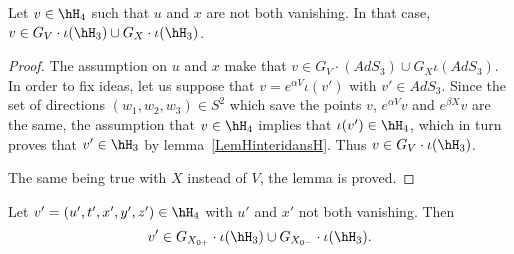 	\begin{lemma}		\label{LemPresqueHOrQadp}
		Let $v\in\hH_4$ such that $u$ and $x$ are not both vanishing. In that case, $v\in G_V\cdot \iota(\hH_3)\cup G_X\cdot\iota(\hH_3)$.
	\end{lemma}

	\begin{proof}
		The assumption on $u$ and $x$ make that $v\in G_V\cdot(AdS_3)\cup G_X\iota(AdS_3)$. In order to fix ideas, let us suppose that $v= e^{\alpha V}\iota(v')$ with $v'\in AdS_3$. Since the set of directions $(w_1,w_2,w_3)\in S^2$ which save the points $v$, $ e^{\alpha V}v$ and $ e^{\beta X}v$ are the same, the assumption that $v\in\hH_4$ implies that $\iota(v')\in \hH_4$, which in turn proves that $v'\in \hH_3$ by lemma~\ref{LemHinteridansH}. Thus $v\in G_V\cdot\iota(\hH_3)$.

		The same being true with $X$ instead of $V$, the lemma is proved.
	\end{proof}

	\begin{proposition}		\label{PropovHhnonXYzero}
		Let $v'=(u',t',x',y',z')\in\hH_4$ with $u'$ and $x'$ not both vanishing. Then
		\begin{equation}
			v'\in G_{X_{0+}}\cdot \iota(\hH_3)\cup G_{X_{0-}}\cdot \iota(\hH_3).
		\end{equation}
	\end{proposition}

